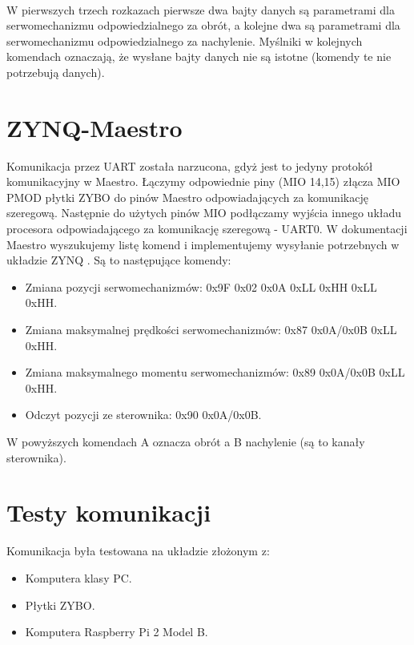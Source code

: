 \paragraph*{}
W pierwszych trzech rozkazach pierwsze dwa bajty danych są parametrami dla serwomechanizmu odpowiedzialnego za obrót, a kolejne dwa są parametrami dla serwomechanizmu odpowiedzialnego za nachylenie. Myślniki w kolejnych komendach oznaczają, że wysłane bajty danych nie są istotne (komendy te nie potrzebują danych).

\section{ZYNQ-Maestro}
\label{sec:zynq-maestro}
Komunikacja przez UART została narzucona, gdyż jest to jedyny protokół komunikacyjny w Maestro. Łączymy odpowiednie piny (MIO 14,15) złącza MIO PMOD płytki ZYBO do pinów Maestro odpowiadających za komunikację szeregową. Następnie do użytych pinów MIO podłączamy wyjścia innego układu procesora odpowiadającego za komunikację szeregową - UART0. W dokumentacji Maestro wyszukujemy listę komend i implementujemy wysyłanie potrzebnych w układzie ZYNQ \cite{MM}. Są to następujące komendy:
\begin{itemize}
\item Zmiana pozycji serwomechanizmów: 0x9F 0x02 0x0A 0xLL 0xHH 0xLL 0xHH.
\item Zmiana maksymalnej prędkości serwomechanizmów: 0x87 0x0A/0x0B 0xLL 0xHH.
\item Zmiana maksymalnego momentu serwomechanizmów: 0x89 0x0A/0x0B 0xLL 0xHH.
\item Odczyt pozycji ze sterownika: 0x90 0x0A/0x0B.
\end{itemize}
W powyższych komendach A oznacza obrót a B nachylenie (są to kanały sterownika).

\section{Testy komunikacji}
\label{testy_komunikacji}
Komunikacja była testowana na układzie złożonym z:
\begin{itemize}
\item Komputera klasy PC.
\item Płytki ZYBO.
\item Komputera Raspberry Pi 2 Model B.
\end{itemize}
